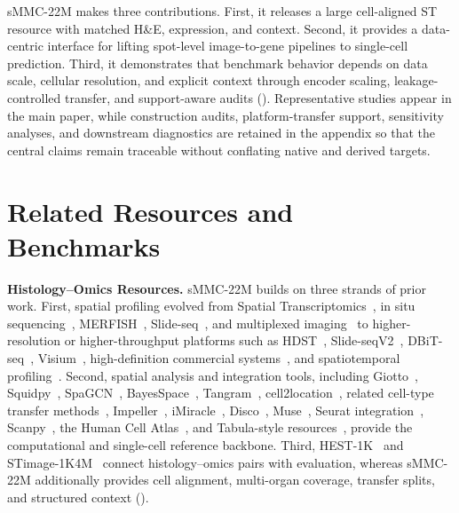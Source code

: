 \documentclass[sigconf,review]{acmart}
\newcommand{\dataset}{sMMC-22M\xspace}
\begin{document}
\dataset makes three contributions. First, it releases a large cell-aligned ST
resource with matched H\&E, expression, and context. Second, it provides a
data-centric interface for lifting spot-level image-to-gene pipelines to
single-cell prediction. Third, it demonstrates that benchmark behavior depends
on data scale, cellular resolution, and explicit context through encoder
scaling, leakage-controlled transfer, and support-aware audits
().
Representative studies appear in the main paper, while construction audits,
platform-transfer support, sensitivity analyses, and downstream diagnostics
are retained in the appendix so that the central claims remain traceable
without conflating native and derived targets.

\section{Related Resources and Benchmarks}

\noindent\textbf{Histology--Omics Resources.}
\dataset builds on three strands of prior work. First, spatial profiling evolved from Spatial Transcriptomics~\cite{stahl2016spatial}, in situ sequencing~\cite{ke2013situ}, MERFISH~\cite{moffitt2016high}, Slide-seq~\cite{rodriques2019slideseq}, and multiplexed imaging~\cite{wang2018multiplexed,eng2019transcriptome} to higher-resolution or higher-throughput platforms such as HDST~\cite{vickovic2019hdst}, Slide-seqV2~\cite{stickels2021slideseqv2}, DBiT-seq~\cite{liu2020dbitseq}, Visium~\cite{10xgenomics2019visium}, high-definition commercial systems~\cite{janesick2023high,oliveira2024characterization}, and spatiotemporal profiling~\cite{chen2022spatiotemporal}. Second, spatial analysis and integration tools, including Giotto~\cite{dries2021giotto}, Squidpy~\cite{palla2022squidpy}, SpaGCN~\cite{hu2021spagcn}, BayesSpace~\cite{zhao2021bayesspace}, Tangram~\cite{biancalani2021deep}, cell2location~\cite{kleshchevnikov2022cell2location}, related cell-type transfer methods~\cite{bergenstrahle2020super,moncada2020integrating,andersson2020single,satija2015spatial}, Impeller~\cite{duan2024impeller}, iMiracle~\cite{duan2024imiracle}, Disco~\cite{duan2025disco}, Muse~\cite{duan2025muse}, Seurat integration~\cite{stuart2019comprehensive,hao2021integrated}, Scanpy~\cite{wolf2018scanpy}, the Human Cell Atlas~\cite{regev2017human}, and Tabula-style resources~\cite{jones2022tabula,rozenblatt2020human}, provide the computational and single-cell reference backbone. Third, HEST-1K~\cite{jaume2025hest} and STimage-1K4M~\cite{chen2024stimage} connect histology--omics pairs with evaluation, whereas \dataset additionally provides cell alignment, multi-organ coverage, transfer splits, and structured context ().
\end{document}
